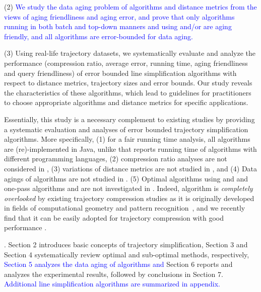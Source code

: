 \stab (2) \textcolor{blue}{We study the data aging problem of \lsa algorithms and distance metrics from the views of aging friendliness and aging error, and prove that only algorithms running in both batch and top-down manners and using \ped and/or \sed are aging friendly, and all algorithms are error-bounded for data aging.}

\stab (3) Using real-life trajectory datasets, we systematically evaluate and analyze the performance (compression ratio, average error, running time, {aging friendliness and query friendliness}) of error bounded line simplification algorithms with respect to {distance metrics,} trajectory sizes and error bounds.
Our study reveals the characteristics of these algorithms, which lead to guidelines for practitioners to choose appropriate algorithms and distance metrics for specific applications.


Essentially, this study is a necessary complement to existing studies by providing a systematic evaluation and analyses of error bounded trajectory simplification algorithms. More specifically, (1) for a fair running time analysis, all algorithms are (re)-implemented in Java, unlike \cite{Zhang:Evaluation} that reports running time of algorithms with different programming languages,
(2) compression ratio analyses are not considered in \cite{Zhang:Evaluation}, 
(3) variations of distance metrics are not studied in \cite{Zhang:Evaluation}, and
(4) {Data agings of \lsa algorithms are not studied in \cite{Zhang:Evaluation}.}
(5) Optimal algorithms using \ped and \sed and one-pass algorithms \siped and \cised are not investigated in \cite{Zhang:Evaluation}.
Indeed, algorithm \siped is {\em completely overlooked} by existing trajectory compression studies as it is originally developed in fields of computational geometry and pattern recognition~\cite{Williams:Longest,Sklansky:Cone,Dunham:Cone, Zhao:Sleeve}, and we recently find that it can be easily adopted for trajectory compression with good performance \cite{Lin:Cised}.




. Section 2 introduces basic concepts of trajectory simplification,
Section 3 and Section 4 systematically review optimal and sub-optimal \lsa methods, respectively,
\textcolor{blue}{Section 5 analyzes the data aging of \lsa algorithms and}
Section 6 reports and analyzes the experimental results, followed by
conclusions in Section 7.
\textcolor{blue}{Additional line simplification algorithms are summarized in appendix.}



